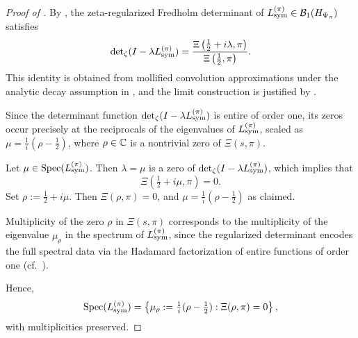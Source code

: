 \begin{proof}[Proof of ]
By , the zeta-regularized Fredholm determinant of \( L_{\mathrm{sym}}^{(\pi)} \in \mathcal{B}_1(H_{\Psi_{\pi}}) \) satisfies
\[
\det\nolimits_{\zeta}(I - \lambda L_{\mathrm{sym}}^{(\pi)}) = \frac{\Xi\left(\tfrac{1}{2} + i\lambda, \pi\right)}{\Xi\left(\tfrac{1}{2}, \pi\right)}.
\]
This identity is obtained from mollified convolution approximations under the analytic decay assumption in , and the limit construction is justified by .

Since the determinant function \( \det\nolimits_{\zeta}(I - \lambda L_{\mathrm{sym}}^{(\pi)}) \) is entire of order one, its zeros occur precisely at the reciprocals of the eigenvalues of \( L_{\mathrm{sym}}^{(\pi)} \), scaled as \( \mu = \frac{1}{i}(\rho - \tfrac{1}{2}) \), where \( \rho \in \mathbb{C} \) is a nontrivial zero of \( \Xi(s, \pi) \).

Let \( \mu \in \operatorname{Spec}(L_{\mathrm{sym}}^{(\pi)}) \). Then \( \lambda = \mu \) is a zero of \( \det\nolimits_{\zeta}(I - \lambda L_{\mathrm{sym}}^{(\pi)}) \), which implies that
\[
\Xi\left(\tfrac{1}{2} + i\mu, \pi\right) = 0.
\]
Set \( \rho := \tfrac{1}{2} + i\mu \). Then \( \Xi(\rho, \pi) = 0 \), and \( \mu = \frac{1}{i}(\rho - \tfrac{1}{2}) \) as claimed.

Multiplicity of the zero \( \rho \) in \( \Xi(s, \pi) \) corresponds to the multiplicity of the eigenvalue \( \mu_\rho \) in the spectrum of \( L_{\mathrm{sym}}^{(\pi)} \), since the regularized determinant encodes the full spectral data via the Hadamard factorization of entire functions of order one (cf.~\cite[Ch.~2]{Levin1996EntireLectures}).

Hence,
\[
\operatorname{Spec}(L_{\mathrm{sym}}^{(\pi)}) = \left\{ \mu_\rho := \tfrac{1}{i}(\rho - \tfrac{1}{2}) : \Xi(\rho, \pi) = 0 \right\},
\]
with multiplicities preserved.
\end{proof}

